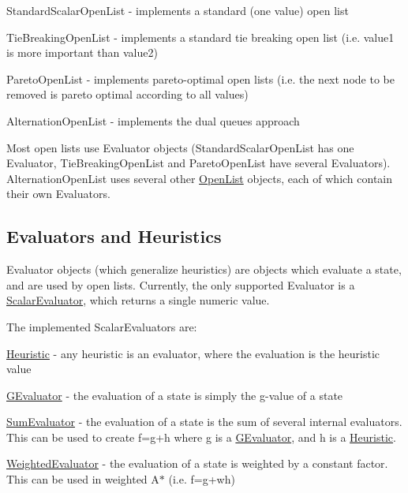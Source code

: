 \begin{DoxyItemize}
\item Standard\-Scalar\-Open\-List -\/ implements a standard (one value) open list
\item Tie\-Breaking\-Open\-List -\/ implements a standard tie breaking open list (i.\-e. value1 is more important than value2)
\item Pareto\-Open\-List -\/ implements pareto-\/optimal open lists (i.\-e. the next node to be removed is pareto optimal according to all values)
\item Alternation\-Open\-List -\/ implements the dual queues approach
\end{DoxyItemize}

Most open lists use Evaluator objects (Standard\-Scalar\-Open\-List has one Evaluator, Tie\-Breaking\-Open\-List and Pareto\-Open\-List have several Evaluators). Alternation\-Open\-List uses several other \hyperlink{classOpenList}{Open\-List} objects, each of which contain their own Evaluators.\hypertarget{index_evaluator_sec}{}\subsection{Evaluators and Heuristics}\label{index_evaluator_sec}
Evaluator objects (which generalize heuristics) are objects which evaluate a state, and are used by open lists. Currently, the only supported Evaluator is a \hyperlink{classScalarEvaluator}{Scalar\-Evaluator}, which returns a single numeric value.

The implemented Scalar\-Evaluators are\-:
\begin{DoxyItemize}
\item \hyperlink{classHeuristic}{Heuristic} -\/ any heuristic is an evaluator, where the evaluation is the heuristic value
\item \hyperlink{classGEvaluator}{G\-Evaluator} -\/ the evaluation of a state is simply the g-\/value of a state
\item \hyperlink{classSumEvaluator}{Sum\-Evaluator} -\/ the evaluation of a state is the sum of several internal evaluators. This can be used to create f=g+h where g is a \hyperlink{classGEvaluator}{G\-Evaluator}, and h is a \hyperlink{classHeuristic}{Heuristic}.
\item \hyperlink{classWeightedEvaluator}{Weighted\-Evaluator} -\/ the evaluation of a state is weighted by a constant factor. This can be used in weighted A$\ast$ (i.\-e. f=g+wh) 
\end{DoxyItemize}